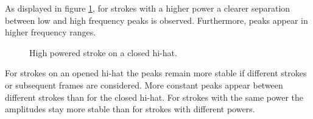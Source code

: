 As displayed in figure \ref{fig:hihat3}, for strokes with a higher power a clearer separation between low and high frequency peaks is observed. Furthermore, peaks appear in higher frequency ranges.

\begin{figure}
	\centering
	\caption{High powered stroke on a closed hi-hat.}
	\label{fig:hihat3}
\end{figure}

For strokes on an opened hi-hat the peaks remain more stable if different strokes or subsequent frames are considered. More constant peaks appear between different strokes than for the closed hi-hat. For strokes with the same power the amplitudes stay more stable than for strokes with different powers. 

